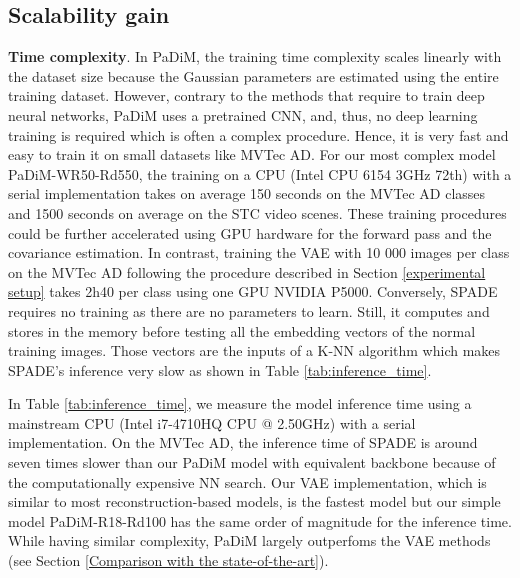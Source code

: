 \documentclass[a4paper,conference]{IEEEtran}
\begin{document}
\subsection{Scalability gain}
\label{PaDiM Scalability gain}
\begin{table}[b!]
\centering
\caption{Average inference time of anomaly localization in seconds on the MVTec AD with a CPU intel i7-4710HQ @ 2.50GHz.}

\label{tab:inference_time}
\end{table}



\textbf{Time complexity}. In PaDiM, the training time complexity scales linearly with the dataset size because the Gaussian parameters are estimated using the entire training dataset. However, contrary to the methods that require to train deep neural networks, PaDiM uses a pretrained CNN, and, thus, no deep learning training is required which is often a complex procedure. Hence, it is very fast and easy to train it on small datasets like MVTec AD. For our most complex model PaDiM-WR50-Rd550, the training on a CPU (Intel CPU 6154 3GHz 72th) with a serial implementation takes on average 150 seconds on the MVTec AD classes and 1500 seconds on average on the STC video scenes. These training procedures could be further accelerated using GPU hardware for the forward pass and the covariance estimation. In contrast, training the VAE with 10 000 images per class on the MVTec AD following the procedure described in Section \ref{experimental setup} takes  2h40 per class using one GPU NVIDIA P5000. Conversely, SPADE \cite{cohen2020subimage} requires no training as there are no parameters to learn. Still, it computes and stores in the memory before testing all the embedding vectors of the normal training images. Those vectors are the inputs of a K-NN algorithm which makes SPADE's inference very slow as shown in Table \ref{tab:inference_time}.




In Table \ref{tab:inference_time}, we measure the model inference time using a mainstream CPU (Intel i7-4710HQ CPU @ 2.50GHz) with a serial implementation.
On the MVTec AD, the inference time of SPADE is around seven times slower than our PaDiM model with equivalent backbone because of the computationally expensive NN search. Our VAE implementation, which is similar to most reconstruction-based models, is the fastest model but our simple model PaDiM-R18-Rd100 has the same order of magnitude for the inference time. While having similar complexity, PaDiM largely outperfoms the VAE methods (see Section \ref{Comparison with the state-of-the-art}). 
\end{document}
